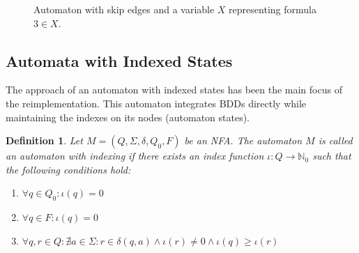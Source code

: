 \documentclass[pdflatex,sn-mathphys-num]{sn-jnl}%
\theoremstyle{thmstyleone}%
\theoremstyle{thmstyletwo}%
\theoremstyle{thmstylethree}%
\newtheorem{definition}{Definition}%
\begin{document}
        \begin{figure}[h]
            \centering
            \caption{Automaton with skip edges and a variable $X$ representing formula $3 \in X$.}
            \label{fig:skip_edges}
        \end{figure}

    \vspace*{2em}

    \subsection{Automata with Indexed States}
        The approach of an automaton with indexed states has been the main focus of the reimplementation. This automaton integrates BDDs directly while maintaining the indexes on its nodes (automaton states).

        \vspace*{0.5em}

        \begin{definition}
            Let $M = (Q, \Sigma, \delta, Q_0, F)$ be an NFA. The automaton $M$ is called an automaton with indexing if there exists an index function $\iota : Q \rightarrow \mathbb{N}_0$ such that the following conditions hold:
            \begin{enumerate}[noindent]
                \item $\forall q \in Q_0 : \iota(q) = 0$
                \item $\forall q \in F : \iota(q) = 0$
                \item $\forall q, r \in Q : \nexists a \in \Sigma : r \in \delta(q, a) \land \iota(r) \neq 0 \land \iota(q) \geq \iota(r)$
            \end{enumerate}
        \end{definition}
\end{document}
